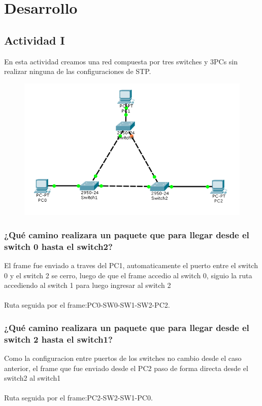 \documentclass[spanish]{udpreport}
\begin{document}
\chapter{Desarrollo}

\section{Actividad I}
En esta actividad creamos una red compuesta por tres switches y 3PCs sin realizar ninguna de las configuraciones de STP.

\begin{figure}[H]
\begin{center}
\includegraphics[scale=0.7]{images/sinSTP.PNG}
\end{center}
\end{figure}
\subsection{ ¿Qué camino realizara un paquete que para llegar desde el switch 0 hasta el switch2?}
El frame fue enviado a traves del PC1, automaticamente el puerto entre el switch 0 y el switch 2 se cerro, luego de que el frame accedio al switch 0, siguio la ruta accediendo al switch 1 para luego ingresar al switch 2 \\\\
Ruta seguida por el frame:PC0-SW0-SW1-SW2-PC2.

\subsection{ ¿Qué camino realizara un paquete que para llegar desde el switch 2 hasta el switch1?}
Como la configuracion entre puertos de los switches no cambio desde el caso anterior, el frame que fue enviado desde el PC2 paso de forma directa desde el switch2 al switch1\\\\
Ruta seguida por el frame:PC2-SW2-SW1-PC0.
\end{document}
